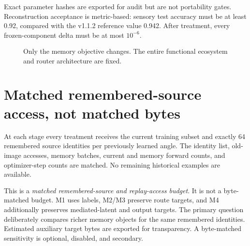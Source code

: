 \documentclass[11pt]{article}
\begin{document}
Exact parameter hashes are exported for audit but are not portability gates. Reconstruction acceptance is metric-based: sensory test accuracy must be at least 0.92, compared with the v1.1.2 reference value 0.942. After treatment, every frozen-component delta must be at most $10^{-6}$.

\begin{figure}[h]
\centering
{}
\caption{Only the memory objective changes. The entire functional ecosystem and router architecture are fixed.}
\end{figure}

\section{Matched remembered-source access, not matched bytes}
At each stage every treatment receives the current training subset and exactly 64 remembered source identities per previously learned angle. The identity list, old-image accesses, memory batches, current and memory forward counts, and optimizer-step counts are matched. No remaining historical examples are available.

This is a \emph{matched remembered-source and replay-access budget}. It is not a byte-matched budget. M1 uses labels, M2/M3 preserve route targets, and M4 additionally preserves mediated-latent and output targets. The primary question deliberately compares richer memory objects for the same remembered identities. Estimated auxiliary target bytes are exported for transparency. A byte-matched sensitivity is optional, disabled, and secondary.
\end{document}
